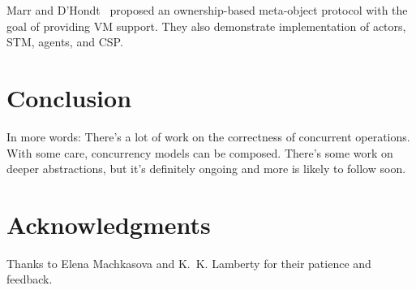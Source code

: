 \documentclass{sig-alternate}
\begin{document}
Marr and D'Hondt~\cite{Marr2012} proposed an ownership-based meta-object protocol with the goal of providing VM support. They also demonstrate implementation of actors, STM, agents, and CSP.

\section{Conclusion}

In more words: There's a lot of work on the correctness of concurrent operations. With some care, concurrency models can be composed. There's some work on deeper abstractions, but it's definitely ongoing and more is likely to follow soon.

\section*{Acknowledgments}

Thanks to Elena Machkasova and K.~K. Lamberty for their patience and feedback.

\printbibliography{}
\end{document}
